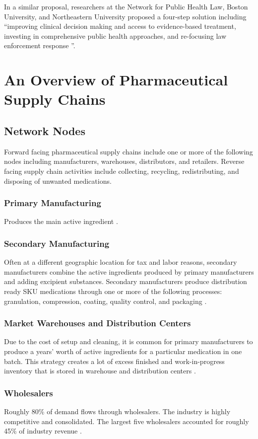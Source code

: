 \documentclass[sigconf]{acmart}
\begin{document}
In a similar proposal, researchers at the Network for Public Health Law, Boston University, and Northeastern University proposed a four-step solution including ``improving clinical decision making and access to evidence-based treatment, investing in comprehensive public health approaches, and re-focusing law enforcement response ''\cite{Davis01}.

\section{An Overview of Pharmaceutical Supply Chains}
\subsection{Network Nodes}
Forward facing pharmaceutical supply chains include one or more of the following nodes including manufacturers, warehouses, distributors, and retailers. Reverse facing supply chain activities include collecting, recycling, redistributing, and disposing of unwanted medications.  
\subsubsection{Primary Manufacturing} Produces the main active ingredient \cite{Shah01}.
\subsubsection{Secondary Manufacturing} Often at a different geographic location for tax and labor reasons, secondary manufacturers combine the active ingredients produced by primary manufacturers and adding excipient substances. Secondary manufacturers produce distribution ready SKU medications through one or more of the following processes: granulation, compression, coating, quality control, and packaging \cite{Shah01}.
\subsubsection{Market Warehouses and Distribution Centers} Due to the cost of setup and cleaning, it is common for primary manufacturers to produce a years' worth of active ingredients for a particular medication in one batch. This strategy creates a lot of excess finished and work-in-progress inventory that is stored in warehouse and distribution centers \cite{Shah01}.
\subsubsection{Wholesalers} Roughly 80\% of demand flows through wholesalers. The industry is highly competitive and consolidated. The largest five wholesalers accounted for roughly 45\% of industry revenue \cite{Shah01} \cite{Hoovers01}.
\end{document}
